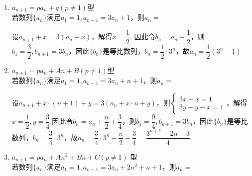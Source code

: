\begin{enumerate}
    \begin{enumerate}
        \item $a_{n+1} = pa_n + q (p \neq 1)$型 \\
            若数列$\{a_n\}$满足$a_1 = 1, a_{n+1} = 3a_n+1$，则$a_n = $
            \begin{jieda}
                设$a_{n+1} + x = 3(a_n + x)$，解得$x = \dfrac{1}{2}$. 因此令$b_n = a_n + \dfrac{1}{2}$，则$b_1 = \dfrac{3}{2}, b_{n+1} = 3b_n$，因此$\{b_n\}$是等比数列，$b_n = \dfrac{1}{2} \cdot 3^n$，故$a_n = \dfrac{1}{2}(3^n - 1)$ 
            \end{jieda}
        \item $a_{n+1} = pa_n + An+B (p \neq 1)$型 \\
            若数列$\{a_n\}$满足$a_1 = 1, a_{n+1} = 3a_n + n + 1$，则$a_n = $
            \begin{jieda}
                设$a_{n+1} + x \cdot (n+1) + y = 3(a_n + x \cdot n + y)$，则$\left \{\begin{array}{l}
                    3x - x = 1  \\
                    3y - y - x = 1
                \end{array} \right.$，解得$x = \dfrac{1}{2}, y = \dfrac{3}{4}$.因此令$b_n = a_n + \dfrac{n}{2} + \dfrac{3}{4}$，则$b_1 = \dfrac{9}{4}, b_{n+1} = 3b_n$，因此$\{b_n\}$是等比数列，$b_n = \dfrac{3}{4} \cdot 3^n$，故$a_n = \dfrac{3}{4} \cdot 3^n - \dfrac{n}{2} - \dfrac{3}{4} = \dfrac{3^{n+1}-2n-3}{4}$
            \end{jieda}
        \item $a_{n+1} = pa_n + An^2+Bn+C (p \neq 1)$ 型 \\
        若数列$\{a_n\}$满足$a_1 = 1, a_{n+1} = 3a_n + 2n^2 + n + 1$，则$a_n = $
\end{enumerate}
\end{enumerate}

